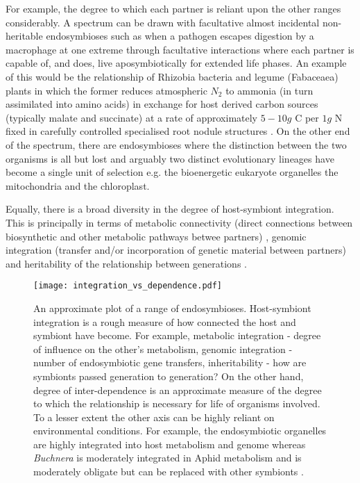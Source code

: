 For example, the degree to which each partner is reliant upon the other ranges considerably. 
A spectrum can be drawn with facultative almost incidental non-heritable endosymbioses such as when a pathogen
escapes digestion by a macrophage at one extreme through facultative interactions where each partner is
capable of, and does, live aposymbiotically for extended life phases. An example of this would be the relationship of
Rhizobia bacteria and legume (Fabaceaea) plants in which the former reduces atmospheric \(N_{2}\) to ammonia (in turn
assimilated into amino acids) \citep{Hirsch1992} in exchange for host derived carbon sources (typically malate 
and succinate) \citep{Prell2006} at a rate of approximately \(5-10g\) C per \(1g\) N 
fixed \citep{Phillips1980} in carefully controlled specialised root nodule structures \citep{Crespi2008}.
On the other end of the spectrum, there are endosymbioses where the distinction between the two organisms is 
all but lost and arguably two distinct evolutionary lineages have become a single unit of selection 
e.g. the bioenergetic eukaryote organelles the mitochondria and the chloroplast. 

Equally, there is a broad diversity in the degree of host-symbiont integration. This is principally in terms of
metabolic connectivity (direct connections between biosynthetic and other metabolic pathways betwee partners) \citep{Karkar2015},
genomic integration (transfer and/or incorporation of genetic material between partners) \citep{Timmis2004} and 
heritability of the relationship between generations \citep{Wernegreen2012}.

\begin{figure}[h!]
\texttt{[image: integration\_vs\_dependence.pdf]}
    \caption{ 
        An approximate plot of a range of endosymbioses.
        Host-symbiont integration is a rough measure of how connected the host and symbiont have become.  For example,
        metabolic integration - degree of influence on the other's metabolism, genomic integration - number of endosymbiotic
        gene transfers, inheritability - how are symbionts passed generation to generation?  On the other hand,
        degree of inter-dependence is an approximate measure of the degree to which the relationship is necessary for 
        life of organisms involved. To a lesser extent the other axis can be highly reliant 
        on environmental conditions. For example, the endosymbiotic organelles are highly integrated into host metabolism and 
        genome whereas \textit{Buchnera} is moderately integrated in Aphid metabolism and is moderately obligate but
        can be replaced with other symbionts \citep{Koga2003}.
    }
    \label{fig:integrationvsdependence}
\end{figure}

